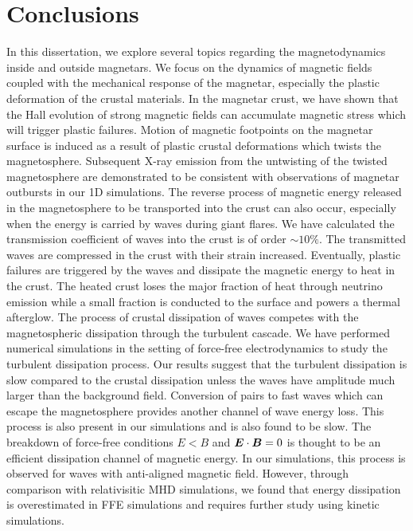 
\chapter{Conclusions}
\label{chap:conclusions}

In this dissertation, we explore several topics regarding the magnetodynamics inside and outside magnetars. 
We focus on the dynamics of magnetic fields coupled with the mechanical response of the magnetar, especially the plastic deformation of the crustal materials. 
In the magnetar crust, we have shown that the Hall evolution of strong magnetic fields can accumulate magnetic stress which will trigger plastic failures.
Motion of magnetic footpoints on the magnetar surface is induced as a result of plastic crustal deformations which twists the magnetosphere.
Subsequent X-ray emission from the untwisting of the twisted magnetosphere are demonstrated to be consistent with observations of magnetar outbursts in our 1D simulations.
The reverse process of magnetic energy released in the magnetosphere to be transported into the crust can also occur, especially when the energy is carried by \alfven waves during giant flares.
We have calculated the transmission coefficient of \alfven waves into the crust is of order $\sim 10\%$.
The transmitted waves are compressed in the crust with their strain increased.
Eventually, plastic failures are triggered by the waves and dissipate the magnetic energy to heat in the crust.
The heated crust loses the major fraction of heat through neutrino emission while a small fraction is conducted to the surface and powers a thermal afterglow.
The process of crustal dissipation of \alfven waves competes with the magnetospheric dissipation through the turbulent cascade.
We have performed numerical simulations in the setting of force-free electrodynamics to study the turbulent dissipation process.
Our results suggest that the turbulent dissipation is slow compared to the crustal dissipation unless the waves have amplitude much larger than the background field.
Conversion of \alfven pairs to fast waves which can escape the magnetosphere provides another channel of wave energy loss.
This process is also present in our simulations and is also found to be slow.
The breakdown of force-free conditions $E<B$ and $\boldsymbol{E}\cdot\boldsymbol{B}=0$ is thought to be an efficient dissipation channel of magnetic energy.
In our simulations, this process is observed for \alfven waves with anti-aligned magnetic field.
However, through comparison with relativisitic MHD simulations, we found that energy dissipation is overestimated in FFE simulations and requires further study using kinetic simulations.

